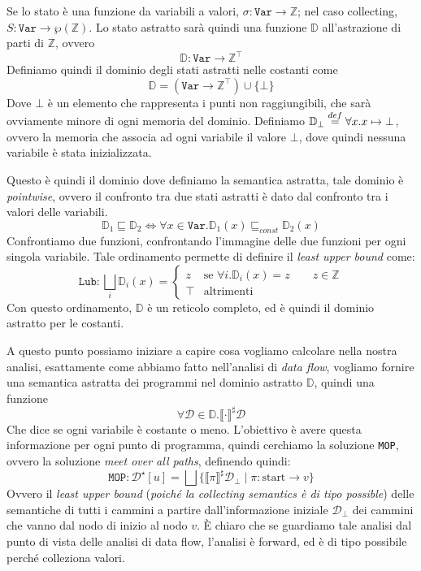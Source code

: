 Se lo stato è una funzione da variabili a valori, $\sigma : \texttt{Var} \to \mathbb{Z}$; 
nel caso collecting, $S : \texttt{Var} \to \wp(\mathbb{Z})$. Lo stato astratto sarà quindi
una funzione $\mathbb{D}$ all'astrazione di parti di $\mathbb{Z}$, ovvero 
\[
    \mathbb{D} : \texttt{Var} \to \mathbb{Z}^\top 
\]
Definiamo quindi il dominio degli stati astratti nelle costanti come 
\[
    \mathbb{D} = (\texttt{Var} \to \mathbb{Z}^\top) \cup \{\bot\}
\] 
Dove $\bot$ è un elemento che rappresenta i punti non raggiungibili, che sarà ovviamente minore 
di ogni memoria del dominio.
Definiamo $\mathbb{D}_\bot \stackrel{\tiny def}{=} \forall x . x \mapsto \bot$, ovvero la memoria 
che associa ad ogni variabile il valore $\bot$, dove quindi nessuna variabile è stata inizializzata.

Questo è quindi il dominio dove definiamo la semantica astratta, tale dominio è \textit{pointwise},
ovvero il confronto tra due stati astratti è dato dal confronto tra i valori delle variabili.
\[
    \mathbb{D}_1 \sqsubseteq \mathbb{D}_2 \iff \forall x \in \texttt{Var} . 
    \mathbb{D}_1(x) \sqsubseteq_{const} \mathbb{D}_2(x)
\]
Confrontiamo due funzioni, confrontando l'immagine delle due funzioni per ogni singola 
variabile. Tale ordinamento permette di definire il \textit{least upper bound} come:
\[
    \texttt{Lub} : \bigsqcup_i \mathbb{D}_i(x) =
    \begin{cases}
        z & \text{se } \forall i . \mathbb{D}_i(x) = z \qquad z \in \mathbb{Z} \\
        \top & \text{altrimenti}
    \end{cases}
\]
Con questo ordinamento, $\mathbb{D}$ è un reticolo completo, ed è quindi il dominio
astratto per le costanti.

A questo punto possiamo iniziare a capire cosa vogliamo calcolare nella nostra analisi,
esattamente come abbiamo fatto nell'analisi di \textit{data flow}, vogliamo fornire una 
semantica astratta dei programmi nel dominio astratto $\mathbb{D}$, quindi una funzione
\[
\forall \mathcal{D} \in \mathbb{D} . \llbracket \cdot \rrbracket^\sharp \mathcal{D}
\]
Che dice se ogni variabile è costante o meno. L'obiettivo è avere questa informazione 
per ogni punto di programma, quindi cerchiamo la soluzione \texttt{MOP}, ovvero la
soluzione \textit{meet over all paths}, definendo quindi:
\[
    \texttt{MOP} : \mathcal{D}^\star [u] = \bigsqcup 
    \{ \llbracket \pi \rrbracket^\sharp \mathcal{D}_\bot \mid \pi:\text{start} \to v \}
\]
Ovvero il \textit{least upper bound}  (\textit{poiché la collecting semantics è di tipo possible}) 
delle semantiche di tutti i cammini a partire dall'informazione iniziale $\mathcal{D}_\bot$
dei cammini 
che vanno dal nodo di inizio al nodo $v$. È chiaro che se guardiamo tale analisi dal punto di vista delle 
analisi di data flow, l'analisi è forward, ed è di tipo possibile perché colleziona valori.

